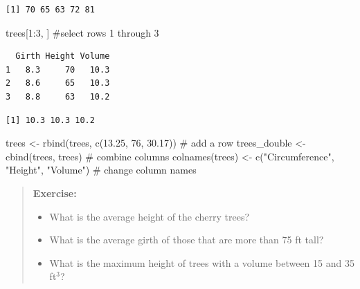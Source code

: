\documentclass[
  letterpaper,
  DIV=11,
  numbers=noendperiod]{scrreprt}
\newenvironment{Shaded}{\begin{snugshade}}{\end{snugshade}}
\newcommand{\CommentTok}[1]{\textcolor[rgb]{0.37,0.37,0.37}{#1}}
\newcommand{\DecValTok}[1]{\textcolor[rgb]{0.68,0.00,0.00}{#1}}
\newcommand{\FloatTok}[1]{\textcolor[rgb]{0.68,0.00,0.00}{#1}}
\newcommand{\FunctionTok}[1]{\textcolor[rgb]{0.28,0.35,0.67}{#1}}
\newcommand{\NormalTok}[1]{\textcolor[rgb]{0.00,0.23,0.31}{#1}}
\newcommand{\OtherTok}[1]{\textcolor[rgb]{0.00,0.23,0.31}{#1}}
\newcommand{\SpecialCharTok}[1]{\textcolor[rgb]{0.37,0.37,0.37}{#1}}
\newcommand{\StringTok}[1]{\textcolor[rgb]{0.13,0.47,0.30}{#1}}
\providecommand{\tightlist}{%
  \setlength{\itemsep}{0pt}\setlength{\parskip}{0pt}}\usepackage{longtable,booktabs,array}
\begin{document}
\begin{verbatim}
[1] 70 65 63 72 81
\end{verbatim}

\begin{Shaded}
\begin{Highlighting}[]
\NormalTok{trees[}\DecValTok{1}\SpecialCharTok{:}\DecValTok{3}\NormalTok{, ] }\CommentTok{\#select rows 1 through 3}
\end{Highlighting}
\end{Shaded}

\begin{verbatim}
  Girth Height Volume
1   8.3     70   10.3
2   8.6     65   10.3
3   8.8     63   10.2
\end{verbatim}

\begin{Shaded}
\end{Shaded}

\begin{verbatim}
[1] 10.3 10.3 10.2
\end{verbatim}

\begin{Shaded}
\begin{Highlighting}[]
\NormalTok{trees }\OtherTok{\textless{}{-}} \FunctionTok{rbind}\NormalTok{(trees, }\FunctionTok{c}\NormalTok{(}\FloatTok{13.25}\NormalTok{, }\DecValTok{76}\NormalTok{, }\FloatTok{30.17}\NormalTok{)) }\CommentTok{\# add a row}
\NormalTok{trees\_double }\OtherTok{\textless{}{-}} \FunctionTok{cbind}\NormalTok{(trees, trees) }\CommentTok{\# combine columns}
\FunctionTok{colnames}\NormalTok{(trees) }\OtherTok{\textless{}{-}} \FunctionTok{c}\NormalTok{(}\StringTok{"Circumference"}\NormalTok{, }\StringTok{"Height"}\NormalTok{, }\StringTok{"Volume"}\NormalTok{) }\CommentTok{\# change column names}
\end{Highlighting}
\end{Shaded}

\begin{quote}
\textbf{Exercise:}

\begin{itemize}
\tightlist
\item
  What is the average height of the cherry trees?
\item
  What is the average girth of those that are more than 75 ft tall?
\item
  What is the maximum height of trees with a volume between 15 and 35
  ft\(^3\)?
\end{itemize}
\end{quote}
\end{document}
